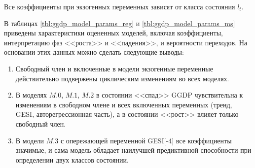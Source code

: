 \documentclass[a4paper,14pt]{extreport}
\begin{document}
Все коэффициенты при экзогенных переменных зависят от класса состояния $l_t$.

В таблицах \ref{tbl:ggdp_model_params_reg} и \ref{tbl:ggdp_model_params_ms} приведены характеристики оцененных моделей, включая коэффициенты, интерпретацию фаз <<роста>> и <<падения>>, и вероятности переходов. На основании этих данных можно сделать следующие выводы:

\begin{enumerate}
	\item Свободный член и включенные в модели экзогенные переменные действительно подвержены циклическим изменениям во всех моделях.
	\item В моделях $M.0$, $M.1$, $M.2$ в состоянии <<спад>> GGDP чувствительна к изменениям в свободном члене и всех включенных переменных (тренд, GESI, авторегрессионная часть), а в состоянии <<рост>> влияет только свободный член.
	\item В модели $M.3$ с опережающей переменной GESI[-4] все коэффициенты значимые, и сама модель обладает наилучшей предиктивной способности при определении двух классов состоянии.
\end{enumerate}
\end{document}
